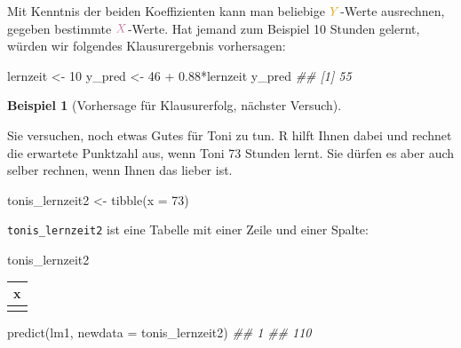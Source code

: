 \documentclass[
  letterpaper,
  twoside,
  open=any]{scrbook}
\newenvironment{Shaded}{\begin{snugshade}}{\end{snugshade}}
\newcommand{\AttributeTok}[1]{\textcolor[rgb]{0.40,0.45,0.13}{#1}}
\newcommand{\DecValTok}[1]{\textcolor[rgb]{0.68,0.00,0.00}{#1}}
\newcommand{\DocumentationTok}[1]{\textcolor[rgb]{0.37,0.37,0.37}{\textit{#1}}}
\newcommand{\FloatTok}[1]{\textcolor[rgb]{0.68,0.00,0.00}{#1}}
\newcommand{\FunctionTok}[1]{\textcolor[rgb]{0.28,0.35,0.67}{#1}}
\newcommand{\NormalTok}[1]{\textcolor[rgb]{0.00,0.23,0.31}{#1}}
\newcommand{\OtherTok}[1]{\textcolor[rgb]{0.00,0.23,0.31}{#1}}
\newcommand{\SpecialCharTok}[1]{\textcolor[rgb]{0.37,0.37,0.37}{#1}}
\theoremstyle{definition}
\theoremstyle{definition}
\theoremstyle{definition}
\newtheorem{example}{Beispiel}[chapter]
\theoremstyle{remark}
\begin{document}
Mit Kenntnis der beiden Koeffizienten kann man beliebige
\(\color{ycol}{Y}\)-Werte ausrechnen, gegeben bestimmte
\(\color{xcol}{X}\)-Werte. Hat jemand zum Beispiel 10 Stunden gelernt,
würden wir folgendes Klausurergebnis vorhersagen:

\begin{Shaded}
\begin{Highlighting}[]
\NormalTok{lernzeit }\OtherTok{\textless{}{-}} \DecValTok{10}
\NormalTok{y\_pred }\OtherTok{\textless{}{-}} \DecValTok{46} \SpecialCharTok{+} \FloatTok{0.88}\SpecialCharTok{*}\NormalTok{lernzeit}
\NormalTok{y\_pred}
\DocumentationTok{\#\# [1] 55}
\end{Highlighting}
\end{Shaded}

\begin{example}[Vorhersage für Klausurerfolg, nächster
Versuch]\protect\hypertarget{exm-noten6}{}\label{exm-noten6}

Sie versuchen, noch etwas Gutes für Toni zu tun. R hilft Ihnen dabei und
rechnet die erwartete Punktzahl aus, wenn Toni 73 Stunden lernt. Sie
dürfen es aber auch selber rechnen, wenn Ihnen das lieber ist.

\end{example}

\begin{Shaded}
\begin{Highlighting}[]
\NormalTok{tonis\_lernzeit2 }\OtherTok{\textless{}{-}} \FunctionTok{tibble}\NormalTok{(}\AttributeTok{x =} \DecValTok{73}\NormalTok{)  }
\end{Highlighting}
\end{Shaded}

\texttt{tonis\_lernzeit2} ist eine Tabelle mit einer Zeile und einer
Spalte:

\begin{Shaded}
\begin{Highlighting}[]
\NormalTok{tonis\_lernzeit2}
\end{Highlighting}
\end{Shaded}

\begin{longtable}[]{@{}r@{}}
\toprule\noalign{}
x \\
\midrule\noalign{}
\endhead
\bottomrule\noalign{}
\endlastfoot
73 \\
\end{longtable}

\begin{Shaded}
\begin{Highlighting}[]
\FunctionTok{predict}\NormalTok{(lm1, }\AttributeTok{newdata =}\NormalTok{ tonis\_lernzeit2)}
\DocumentationTok{\#\#   1 }
\DocumentationTok{\#\# 110}
\end{Highlighting}
\end{Shaded}
\end{document}
